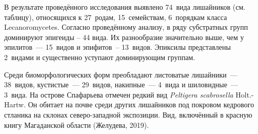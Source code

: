 В результате проведённого исследования выявлено 74~вида лишайников (см. таблицу), относящихся к 27~родам, 15~семействам, 6~порядкам класса Lecanoromycetes. Согласно проведённому анализу, в ряду субстратных групп доминируют эпигеиды – 44 вида. Их разнообразие значительно выше, чем у эпилитов~--- 15~видов и эпифитов~-- 13~видов. Эпиксилы представлены 2~видами и существенно уступают доминирующим группам.

Среди биоморфологических форм преобладают листоватые лишайники~--- 38~видов, кустистые~--- 29~видов, накипные~--- 4~вида и шиловидные~--- 3~вида. На острове Спафарьева отмечен редкий вид \textit{Peltigera scabrosella} Holt.-Hartw. Он обитает на почве среди других лишайников под покровом кедрового стланика на склонах северо-западной экспозиции. Вид, включённый в красную книгу Магаданской области (Желудева, 2019).

